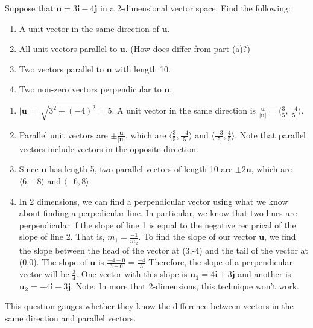 \documentclass[handout]{ximera}
\begin{document}
\begin{problem}
Suppose that $\mathbf{u}=3 \mathbf{i} - 4 \mathbf{j}$ in a 2-dimensional vector space. Find the following:
\begin{enumerate}
\item A unit vector in the same direction of $\mathbf{u}$. 
\item All unit vectors parallel to $\mathbf{u}$. (How does differ from part (a)?)
\item Two vectors parallel to $\mathbf{u}$ with length 10.
\item Two non-zero vectors perpendicular to $\mathbf{u}$.
\end{enumerate}
	\begin{freeResponse}
	\begin{enumerate}
	\item $|\mathbf{u}|= \sqrt{3^2+(-4)^2} = 5$. A unit vector in the same direction is $\frac{\mathbf{u}}{|\mathbf{u}|}= \langle \frac{3}{5}, \frac{-4}{5} \rangle.$
	\item Parallel unit vectors are $\pm \frac{\mathbf{u}}{|\mathbf{u}|}$, which are $\langle \frac{3}{5}, \frac{-4}{5} \rangle$ and $\langle \frac{-3}{5}, \frac{4}{5} \rangle$. Note that parallel vectors include vectors in the opposite direction. 
	\item Since $\mathbf{u}$ has length 5, two parallel vectors of length 10 are $\pm 2\mathbf{u}$, which are $\langle 6, -8 \rangle$ and $\langle -6, 8 \rangle$. 
	\item In 2 dimensions, we can find a perpendicular vector using what we know about finding a perpedicular line.  In particular, we know that two lines are perpendicular if the slope of line 1 is equal to the negative reciprical of the slope of line 2.  That is, $m_1 = \frac{-1}{m_2}.$  To find the slope of our vector $\mathbf{u}$, we find the slope between the head of the vector at (3,-4) and the tail of the vector at (0,0).  The slope of $\mathbf{u}$ is $\frac{-4-0}{3-0} = \frac{-4}{3}$  Therefore, the slope of a perpendicular vector will be $\frac{3}{4}$.  One vector with this slope is $\boxed{\mathbf{u_1}=4 \mathbf{i} +3 \mathbf{j}}$ and another is $\boxed{\mathbf{u_2}=- 4 \mathbf{i} - 3 \mathbf{j}}$.  Note: In more that 2-dimensions, this technique won't work.
	\end{enumerate}
	\end{freeResponse}

\end{problem}

\begin{instructorNotes}
This question gauges whether they know the difference between vectors in the same direction and parallel vectors.
\end{instructorNotes}
\end{document}
